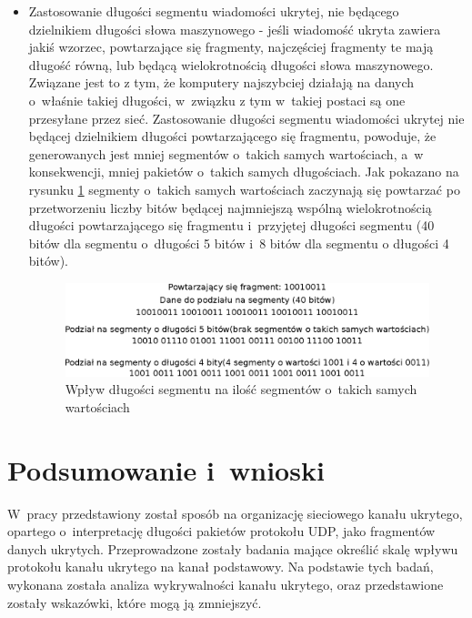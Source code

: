 \documentclass[a4paper, twoside, 12pt]{report}
\begin{document}
\begin{itemize}
           \item Zastosowanie długości segmentu wiadomości ukrytej, nie będącego
               dzielnikiem długości słowa maszynowego - jeśli wiadomość ukryta
               zawiera jakiś wzorzec, powtarzające się fragmenty, najczęściej fragmenty
               te mają długość równą, lub będącą wielokrotnością długości słowa maszynowego.
               Związane jest to z tym, że komputery najszybciej działają na danych
               o~właśnie takiej długości, w~związku z tym w~takiej postaci są one przesyłane
               przez sieć. Zastosowanie długości segmentu wiadomości ukrytej nie będącej
               dzielnikiem długości powtarzającego się fragmentu, powoduje, że generowanych
               jest mniej segmentów o~takich samych wartościach, a~w konsekwencji,
               mniej pakietów o~takich samych długościach. Jak pokazano na rysunku \ref{REPETEDFRAGMENTS}
               segmenty o~takich samych wartościach zaczynają się powtarzać po
               przetworzeniu liczby bitów będącej najmniejszą wspólną wielokrotnością
               długości powtarzającego się fragmentu i~przyjętej długości segmentu
               (40 bitów dla segmentu o~długości 5 bitów i~8 bitów dla segmentu o
               długości 4 bitów).

                \begin{figure}[h]
                        \centering
                        \includegraphics[scale=0.75]{powtorzone_fragmenty}
                        \caption{Wpływ długości segmentu na ilość segmentów o~takich samych wartościach}
                        \label{REPETEDFRAGMENTS}
                \end{figure}
       \end{itemize}


\chapter{Podsumowanie i~wnioski}
    W~pracy przedstawiony został sposób na organizację sieciowego kanału ukrytego,
    opartego o~interpretację długości pakietów protokołu UDP, jako fragmentów
    danych ukrytych. Przeprowadzone zostały badania mające określić skalę wpływu
    protokołu kanału ukrytego na kanał podstawowy. Na podstawie tych badań, wykonana
    została analiza wykrywalności kanału ukrytego, oraz przedstawione zostały wskazówki,
    które mogą ją zmniejszyć.
\end{document}
